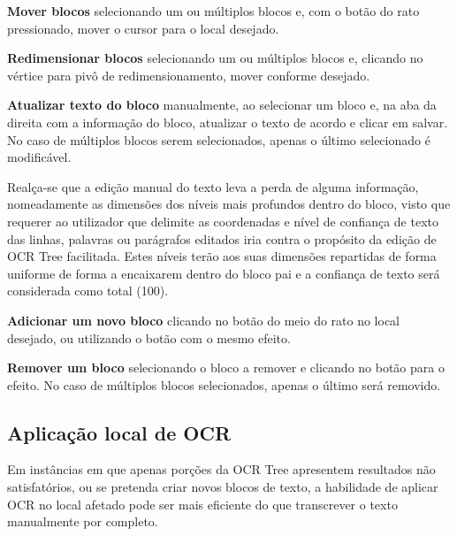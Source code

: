 

\textbf{Mover blocos} selecionando um ou múltiplos blocos e, com o botão do rato pressionado, mover o cursor para o local desejado.



\textbf{Redimensionar blocos} selecionando um ou múltiplos blocos e, clicando no vértice para pivô de redimensionamento, mover conforme desejado.


\textbf{Atualizar texto do bloco} manualmente, ao selecionar um bloco e, na aba da direita com a informação do bloco, atualizar o texto de acordo e clicar em salvar. No caso de múltiplos blocos serem selecionados, apenas o último selecionado é modificável.

Realça-se que a edição manual do texto leva a perda de alguma informação, nomeadamente as dimensões dos níveis mais profundos dentro do bloco, visto que requerer ao utilizador que delimite as coordenadas e nível de confiança de texto das linhas, palavras ou parágrafos editados iria contra o propósito da edição de OCR Tree facilitada. Estes níveis terão aos suas dimensões repartidas de forma uniforme de forma a encaixarem dentro do bloco pai e a confiança de texto será considerada como total (100).


\textbf{Adicionar um novo bloco} clicando no botão do meio do rato no local desejado, ou utilizando o botão com o mesmo efeito.



\textbf{Remover um bloco} selecionando o bloco a remover e clicando no botão para o efeito. No caso de múltiplos blocos selecionados, apenas o último será removido.




\subsection{Aplicação local de OCR}

Em instâncias em que apenas porções da OCR Tree apresentem resultados não satisfatórios, ou se pretenda criar novos blocos de texto, a habilidade de aplicar OCR no local afetado pode ser mais eficiente do que transcrever o texto manualmente por completo.

